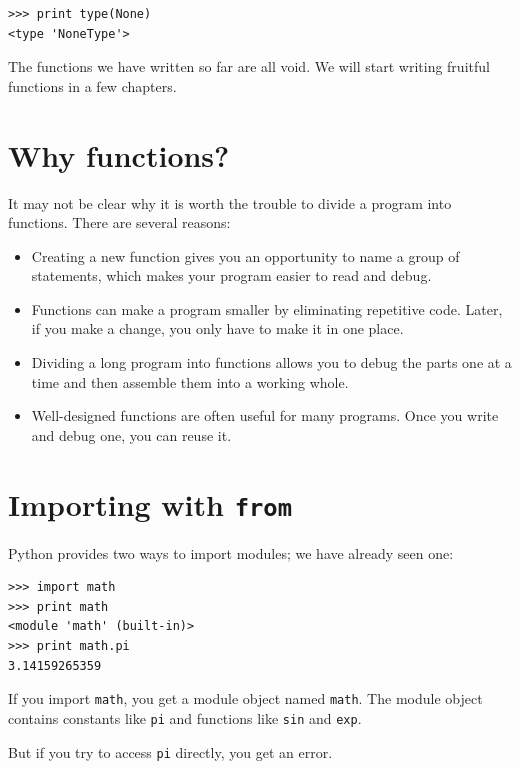 \documentclass[10pt]{book}
\begin{document}
\begin{verbatim}
>>> print type(None)
<type 'NoneType'>
\end{verbatim}
%
The functions we have written so far are all void.  We will start
writing fruitful functions in a few chapters.


\section{Why functions?}

It may not be clear why it is worth the trouble to divide
a program into functions.  There are several reasons:

\begin{itemize}

\item Creating a new function gives you an opportunity to name a group
of statements, which makes your program easier to read and debug.

\item Functions can make a program smaller by eliminating repetitive
code.  Later, if you make a change, you only have
to make it in one place.

\item Dividing a long program into functions allows you to debug the
parts one at a time and then assemble them into a working whole.

\item Well-designed functions are often useful for many programs.
Once you write and debug one, you can reuse it.

\end{itemize}


\section{Importing with {\tt from}}

Python provides two ways to import modules; we have already seen one:

\begin{verbatim}
>>> import math
>>> print math
<module 'math' (built-in)>
>>> print math.pi
3.14159265359
\end{verbatim}
%
If you import {\tt math}, you get a module object named {\tt math}.
The module object contains constants like {\tt pi} and functions
like {\tt sin} and {\tt exp}.

But if you try to access {\tt pi} directly, you get an error.
\end{document}
